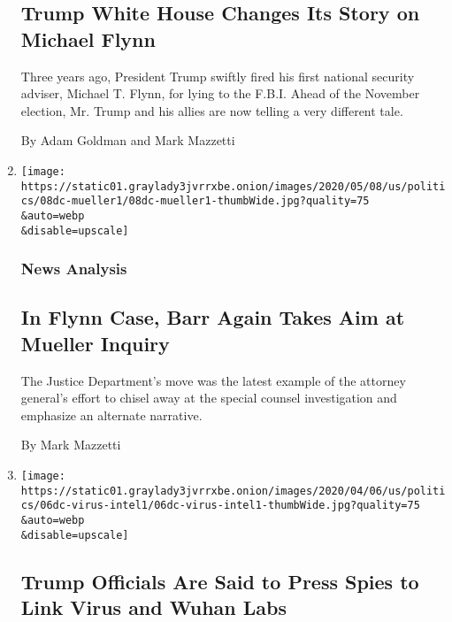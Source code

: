 \begin{enumerate}
  \hypertarget{trump-white-house-changes-its-story-on-michael-flynn}{%
  \subsection{Trump White House Changes Its Story on Michael
  Flynn}\label{trump-white-house-changes-its-story-on-michael-flynn}}

  Three years ago, President Trump swiftly fired his first national
  security adviser, Michael T. Flynn, for lying to the F.B.I. Ahead of
  the November election, Mr. Trump and his allies are now telling a very
  different tale.

  By Adam Goldman and Mark Mazzetti
\item
  \href{/2020/05/08/us/politics/barr-mueller-investigation-flynn.html}{}

  \texttt{[image: https://static01.graylady3jvrrxbe.onion/images/2020/05/08/us/politics/08dc-mueller1/08dc-mueller1-thumbWide.jpg?quality=75\\\&auto=webp\\\&disable=upscale]}

  \hypertarget{news-analysis-2}{%
  \subsubsection{News Analysis}\label{news-analysis-2}}

  \hypertarget{in-flynn-case-barr-again-takes-aim-at-mueller-inquiry}{%
  \subsection{In Flynn Case, Barr Again Takes Aim at Mueller
  Inquiry}\label{in-flynn-case-barr-again-takes-aim-at-mueller-inquiry}}

  The Justice Department's move was the latest example of the attorney
  general's effort to chisel away at the special counsel investigation
  and emphasize an alternate narrative.

  By Mark Mazzetti
\item
  \href{/2020/04/30/us/politics/trump-administration-intelligence-coronavirus-china.html}{}

  \texttt{[image: https://static01.graylady3jvrrxbe.onion/images/2020/04/06/us/politics/06dc-virus-intel1/06dc-virus-intel1-thumbWide.jpg?quality=75\\\&auto=webp\\\&disable=upscale]}

  \hypertarget{trump-officials-are-said-to-press-spies-to-link-virus-and-wuhan-labs}{%
  \subsection{Trump Officials Are Said to Press Spies to Link Virus and
  Wuhan
  Labs}\label{trump-officials-are-said-to-press-spies-to-link-virus-and-wuhan-labs}}


\end{enumerate}
